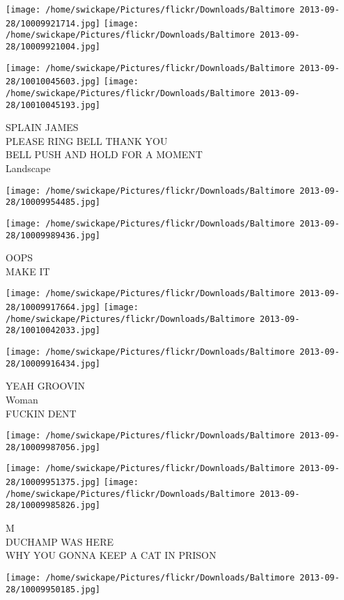 \documentclass[10pt,letterpaper]{article}
\begin{document}
\texttt{[image: /home/swickape/Pictures/flickr/Downloads/Baltimore 2013-09-28/10009921714.jpg]}
\texttt{[image: /home/swickape/Pictures/flickr/Downloads/Baltimore 2013-09-28/10009921004.jpg]}

\texttt{[image: /home/swickape/Pictures/flickr/Downloads/Baltimore 2013-09-28/10010045603.jpg]}
\texttt{[image: /home/swickape/Pictures/flickr/Downloads/Baltimore 2013-09-28/10010045193.jpg]}

SPLAIN JAMES\\
PLEASE RING BELL THANK YOU\\
BELL PUSH AND HOLD FOR A MOMENT\\
Landscape
\pagebreak

\texttt{[image: /home/swickape/Pictures/flickr/Downloads/Baltimore 2013-09-28/10009954485.jpg]}

\vspace{0.25in}
\texttt{[image: /home/swickape/Pictures/flickr/Downloads/Baltimore 2013-09-28/10009989436.jpg]}

OOPS\\
MAKE IT
\pagebreak

\texttt{[image: /home/swickape/Pictures/flickr/Downloads/Baltimore 2013-09-28/10009917664.jpg]}
\texttt{[image: /home/swickape/Pictures/flickr/Downloads/Baltimore 2013-09-28/10010042033.jpg]}

\texttt{[image: /home/swickape/Pictures/flickr/Downloads/Baltimore 2013-09-28/10009916434.jpg]}

YEAH GROOVIN\\
Woman\\
FUCKIN DENT
\pagebreak

\texttt{[image: /home/swickape/Pictures/flickr/Downloads/Baltimore 2013-09-28/10009987056.jpg]}

\vspace{0.25in}
\texttt{[image: /home/swickape/Pictures/flickr/Downloads/Baltimore 2013-09-28/10009951375.jpg]}
\texttt{[image: /home/swickape/Pictures/flickr/Downloads/Baltimore 2013-09-28/10009985826.jpg]}

M\\
DUCHAMP WAS HERE\\
WHY YOU GONNA KEEP A CAT IN PRISON
\pagebreak

\texttt{[image: /home/swickape/Pictures/flickr/Downloads/Baltimore 2013-09-28/10009950185.jpg]}
\end{document}
